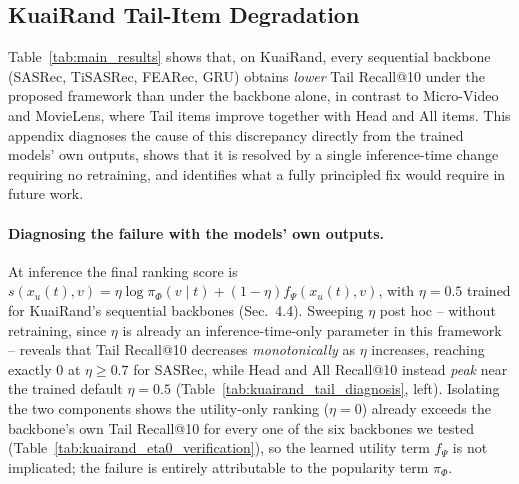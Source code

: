 \subsection{KuaiRand Tail-Item Degradation}
\label{app:kuairand_tail}

Table~\ref{tab:main_results} shows that, on KuaiRand, every sequential backbone (SASRec,
TiSASRec, FEARec, GRU) obtains \emph{lower} Tail Recall@10 under the proposed framework
than under the backbone alone, in contrast to Micro-Video and MovieLens, where Tail items
improve together with Head and All items. This appendix diagnoses the cause of this
discrepancy directly from the trained models' own outputs, shows that it is resolved by a
single inference-time change requiring no retraining, and identifies what a fully
principled fix would require in future work.

\paragraph{Diagnosing the failure with the models' own outputs.}
At inference the final ranking score is
$s(x_u(t),v) = \eta\log\pi_\Phi(v\mid t) + (1-\eta)f_\Psi(x_u(t),v)$,
with $\eta=0.5$ trained for KuaiRand's sequential backbones (Sec.~4.4). Sweeping $\eta$
post hoc -- without retraining, since $\eta$ is already an inference-time-only parameter
in this framework -- reveals that Tail Recall@10 decreases \emph{monotonically} as
$\eta$ increases, reaching exactly $0$ at $\eta \geq 0.7$ for SASRec, while Head and All
Recall@10 instead \emph{peak} near the trained default $\eta=0.5$
(Table~\ref{tab:kuairand_tail_diagnosis}, left). Isolating the two components shows the
utility-only ranking ($\eta=0$) already exceeds the backbone's own Tail Recall@10 for
every one of the six backbones we tested (Table~\ref{tab:kuairand_eta0_verification}), so
the learned utility term $f_\Psi$ is not implicated; the failure is entirely attributable
to the popularity term $\pi_\Phi$.

